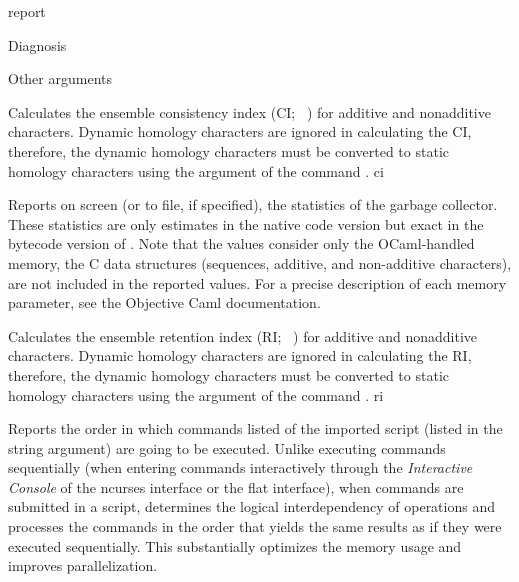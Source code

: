 \begin{command}{report}{}
\begin{arguments}
\begin{argumentgroup}{Diagnosis}
		\end{argumentgroup} 

		\begin{argumentgroup}{Other arguments}
			{} 

	      {Calculates the ensemble consistency index (CI; ~\cite{farris1989,
	      klugeandfarris1969,}) for additive and nonadditive
	      characters. Dynamic homology characters are ignored in calculating
	      the CI, therefore, the dynamic homology characters must be converted
	      to static homology characters using the argument  
	      of the command .}
	      {ci}
	      
                {Reports on screen (or to file, if specified), the statistics of
                the garbage collector.  These statistics are only estimates in
                the native code version but exact in the bytecode version of
                \poy. Note that the values consider only the OCaml-handled
                memory, the C data structures (sequences, additive, and
                non-additive characters), are not included in the reported
                values. For a precise description of each memory parameter, see
                the Objective Caml documentation.}
                {}
	     
	      {Calculates the ensemble retention index (RI; ~\cite{farris1989}) for additive
	      and nonadditive characters. Dynamic homology characters are ignored in calculating
	      the RI, therefore, the dynamic homology characters must be converted
	      to static homology characters using the argument  
	      of the command .}
	      {ri}
	     
                {Reports the order in which commands listed of the imported
                script (listed in the string argument) are going to be executed.
                Unlike executing commands sequentially (when entering commands
                interactively through the \emph{Interactive Console} of the ncurses
                interface or the flat interface), when commands are submitted in a 
                script, \poy determines the logical interdependency of operations
                and processes the commands in the order that yields the same
                results as if they were executed sequentially. This substantially
                optimizes the memory usage and improves parallelization.
                
}
\end{argumentgroup}
\end{arguments}
\end{command}
